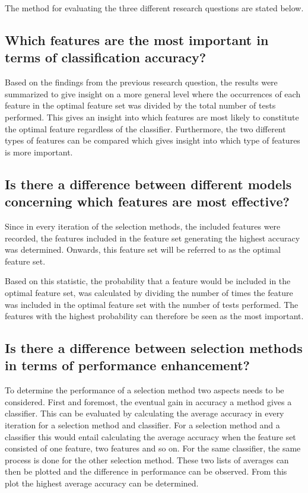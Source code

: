 \documentclass{kththesis}
\begin{document}
The method for evaluating the three different research questions are stated below.

\subsection{Which features are the most important in terms of classification accuracy?}
Based on the findings from the previous research question, the results were summarized to give insight on a more general level where the occurrences of each feature in the optimal feature set was divided by the total number of tests performed. This gives an insight into which features are most likely to constitute the optimal feature regardless of the classifier. Furthermore, the two different types of features can be compared which gives insight into which type of features is more important.

\subsection{Is there a difference between different models concerning which features are most effective?}
Since in every iteration of the selection methods, the included features were recorded, the features included in the feature set generating the highest accuracy was determined. Onwards, this feature set will be referred to as the optimal feature set. 

Based on this statistic, the probability that a feature would be included in the optimal feature set, was calculated by dividing the number of times the feature was included in the optimal feature set with the number of tests performed. The features with the highest probability can therefore be seen as the most important.


\subsection{Is there a difference between selection methods in terms of performance enhancement?}

To determine the performance of a selection method two aspects needs to be considered. First and foremost, the eventual gain in accuracy a method gives a classifier. This can be evaluated by calculating the average accuracy in every iteration for a selection method and classifier. For a selection method and a classifier this would entail calculating the average accuracy when the feature set consisted of one feature, two features and so on. For the same classifier, the same process is done for the other selection method. These two lists of averages can then be plotted and the difference in performance can be observed. From this plot the highest average accuracy can be determined. 
\end{document}
